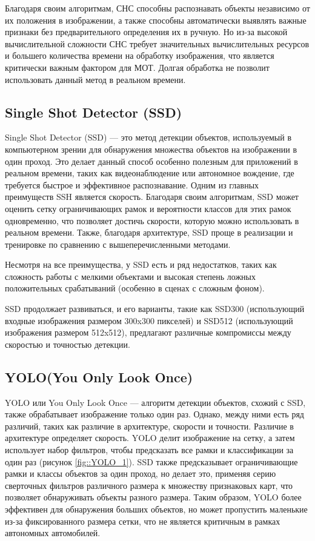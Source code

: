 Благодаря своим алгоритмам, СНС способны распознавать объекты независимо от их положения в изображении, а также способны автоматически выявлять важные признаки без предварительного определения их в ручную. Но из-за высокой вычислительной сложности СНС требует значительных вычислительных ресурсов и большего количества времени на обработку изображения, что является критически важным фактором для МОТ. Долгая обработка не позволит использовать данный метод в реальном времени.

\subsection{Single Shot Detector (SSD)}

Single Shot Detector (SSD) --- это метод детекции объектов, используемый в компьютерном зрении для обнаружения множества объектов на изображении в один проход. Это делает данный способ особенно полезным для приложений в реальном времени, таких как видеонаблюдение или автономное вождение, где требуется быстрое и эффективное распознавание. Одним из главных преимуществ SSH является скорость. Благодаря своим алгоритмам, SSD может оценить сетку ограничивающих рамок и вероятности классов для этих рамок одновременно, что позволяет достичь скорости, которую можно использовать в реальном времени. Также, благодаря архитектуре, SSD проще в реализации и тренировке по сравнению с вышеперечисленными методами.

Несмотря на все преимущества, у SSD есть и ряд недостатков, таких как сложность работы с мелкими объектами и высокая степень ложных положительных срабатываний (особенно в сценах с сложным фоном).

SSD продолжает развиваться, и его варианты, такие как SSD300 (использующий входные изображения размером 300x300 пикселей) и SSD512 (использующий изображения размером 512x512), предлагают различные компромиссы между скоростью и точностью детекции.

\subsection{YOLO(You Only Look Once)}

YOLO или You Only Look Once --- алгоритм детекции объектов, схожий с SSD, также обрабатывает изображение только один раз. Однако, между ними есть ряд различий, таких как различие в архитектуре, скорости и точности. Различие в архитектуре определяет скорость. YOLO делит изображение на сетку, а затем использует набор фильтров, чтобы предсказать все рамки и классификации за один раз (рисунок \ref{fig::YOLO_1}). SSD также предсказывает ограничивающие рамки и классы объектов за один проход, но делает это, применяя серию сверточных фильтров различного размера к множеству признаковых карт, что позволяет обнаруживать объекты разного размера. Таким образом, YOLO более эффективен для обнаружения больших объектов, но может пропустить маленькие из-за фиксированного размера сетки, что не является критичным в рамках автономных автомобилей. 

